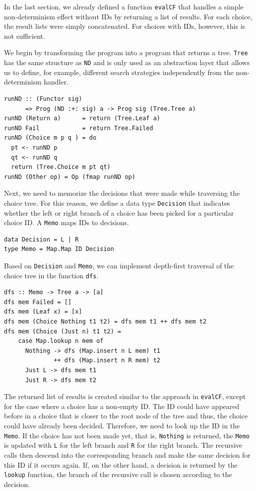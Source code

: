 \documentclass[a4paper, 11pt, fleqn, twoside, abstract=on]{scrreprt}
\newcommand{\hinl}[1]{\texttt{#1}}
\begin{document}
In the last section, we already defined a function \hinl{evalCF} that handles a simple non-determinism effect without IDs by returning a list of results.
For each choice, the result lists were simply concatenated.
For choices with IDs, however, this is not sufficient.

We begin by transforming the program into a program that returns a tree.
\hinl{Tree} has the same structure as \hinl{ND} and is only used as an abstraction layer that allows us to define, for example, different search strategies independently from the non-determinism handler.
 
\begin{verbatim}
runND :: (Functor sig) 
      => Prog (ND :+: sig) a -> Prog sig (Tree.Tree a)
runND (Return a)      = return (Tree.Leaf a)
runND Fail            = return Tree.Failed
runND (Choice m p q ) = do
  pt <- runND p
  qt <- runND q
  return (Tree.Choice m pt qt)
runND (Other op) = Op (fmap runND op)
\end{verbatim}

Next, we need to memorize the decisions that were made while traversing the choice tree.
For this reason, we define a data type \hinl{Decision} that indicates whether the left or right branch of a choice has been picked for a particular choice ID.
A \hinl{Memo} maps IDs to decisions.

\begin{verbatim}
data Decision = L | R
type Memo = Map.Map ID Decision
\end{verbatim}

Based on \hinl{Decision} and \hinl{Memo}, we can implement depth-first traversal of the choice tree in the function \hinl{dfs}.

\begin{verbatim}
dfs :: Memo -> Tree a -> [a]
dfs mem Failed = []
dfs mem (Leaf x) = [x]
dfs mem (Choice Nothing t1 t2) = dfs mem t1 ++ dfs mem t2
dfs mem (Choice (Just n) t1 t2) =
    case Map.lookup n mem of
      Nothing -> dfs (Map.insert n L mem) t1 
              ++ dfs (Map.insert n R mem) t2
      Just L -> dfs mem t1
      Just R -> dfs mem t2
\end{verbatim}
\noindent
The returned list of results is created similar to the approach in \hinl{evalCF}, except for the case where a choice has a non-empty ID.
The ID could have appeared before in a choice that is closer to the root node of the tree and thus, the choice could have already been decided.
Therefore, we need to look up the ID in the \hinl{Memo}.
If the choice has not been made yet, that is, \hinl{Nothing} is returned, the \hinl{Memo} is updated with \hinl{L} for the left branch and \hinl{R} for the right branch.
The recursive calls then descend into the corresponding branch and make the same decision for this ID if it occurs again.
If, on the other hand, a decision is returned by the \hinl{lookup} function, the branch of the recursive call is chosen according to the decision.
\end{document}
